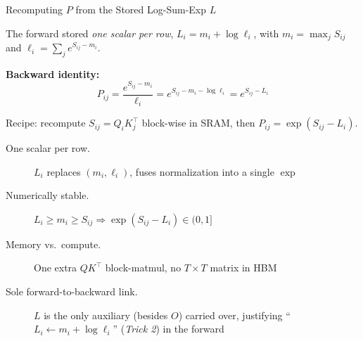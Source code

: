 \begin{frame}{Recomputing $P$ from the Stored Log-Sum-Exp $L$}

  The forward stored \emph{one scalar per row}, $L_i = m_i + \log \ell_i$, with $m_i = \max_j S_{ij}$ and $\ell_i = \sum_j e^{S_{ij} - m_i}$.

  \vspace{0.4em}
  \textbf{Backward identity:}
  \vspace{-0.3em}
  \[
    P_{ij} = \frac{e^{S_{ij} - m_i}}{\ell_i}
           = e^{S_{ij} - m_i - \log \ell_i}
           = e^{S_{ij} - L_i}
  \]

  \vspace{-0.2em}
  Recipe: recompute $S_{ij} = Q_i K_j^\top$ block-wise in SRAM, then $P_{ij} = \exp(S_{ij} - L_i)$.

  \vspace{0.5em}
  \begin{description}
    \item[One scalar per row.] $L_i$ replaces $(m_i, \ell_i)$, fuses normalization into a single $\exp$
    \item[Numerically stable.] $L_i \geq m_i \geq S_{ij} \Rightarrow \exp(S_{ij} - L_i) \in (0, 1]$
    \item[Memory vs.\ compute.] One extra $QK^\top$ block-matmul, no $T \times T$ matrix in HBM
    \item[Sole forward-to-backward link.] $L$ is the only auxiliary (besides $O$) carried over, justifying ``$L_i \gets m_i + \log \ell_i$'' (\emph{Trick 2}) in the forward
  \end{description}
\end{frame}

